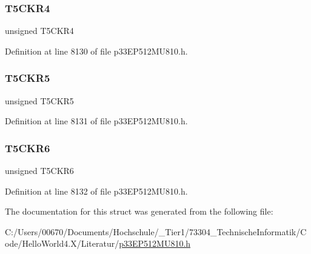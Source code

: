 \subsubsection{\texorpdfstring{T5\+C\+K\+R4}{T5CKR4}}
{\footnotesize\ttfamily unsigned T5\+C\+K\+R4}



Definition at line 8130 of file p33\+E\+P512\+M\+U810.\+h.

\mbox{\label{structtag_r_p_i_n_r4_b_i_t_s_ac25e67ca0130a194694fa1fa338102c1}} 
\subsubsection{\texorpdfstring{T5\+C\+K\+R5}{T5CKR5}}
{\footnotesize\ttfamily unsigned T5\+C\+K\+R5}



Definition at line 8131 of file p33\+E\+P512\+M\+U810.\+h.

\mbox{\label{structtag_r_p_i_n_r4_b_i_t_s_ac22116ad9599c4ce6379d42b5f7bbc0d}} 
\subsubsection{\texorpdfstring{T5\+C\+K\+R6}{T5CKR6}}
{\footnotesize\ttfamily unsigned T5\+C\+K\+R6}



Definition at line 8132 of file p33\+E\+P512\+M\+U810.\+h.



The documentation for this struct was generated from the following file\+:\begin{DoxyCompactItemize}
\item 
C\+:/\+Users/00670/\+Documents/\+Hochschule/\+\_\+\+Tier1/73304\+\_\+\+Technische\+Informatik/\+Code/\+Hello\+World4.\+X/\+Literatur/\hyperlink{p33_e_p512_m_u810_8h}{p33\+E\+P512\+M\+U810.\+h}\end{DoxyCompactItemize}
